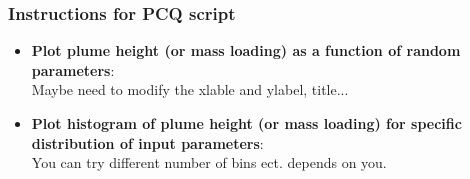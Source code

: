 \documentclass[10pt]{beamer}
\begin{document}
 \begin{frame}
 \frametitle{Instructions for PCQ script}
 \begin{itemize}
 \item {\bf Plot plume height (or mass loading) as a function of random parameters}:\\
 Maybe need to modify the xlable and ylabel, title...
 \item {\bf Plot histogram of plume height (or mass loading) for specific distribution of input parameters}:\\
 You can try different number of bins ect. depends on you.
\end{itemize}
\end{frame}




\begin{frame}
\Large
\begin{center}
\end{center}
\end{frame}
\end{document}
